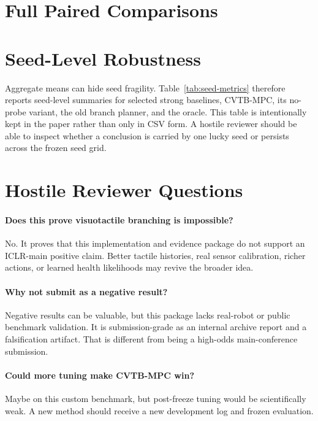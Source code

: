 \documentclass{article}
\newcommand{\method}{\textsc{CVTB-MPC}}
\begin{document}


\clearpage
\section{Full Paired Comparisons}



\clearpage
\section{Seed-Level Robustness}

Aggregate means can hide seed fragility. Table~\ref{tab:seed-metrics} therefore reports seed-level summaries for selected strong baselines, \method{}, its no-probe variant, the old branch planner, and the oracle. This table is intentionally kept in the paper rather than only in CSV form. A hostile reviewer should be able to inspect whether a conclusion is carried by one lucky seed or persists across the frozen seed grid.



\clearpage
\section{Hostile Reviewer Questions}

\paragraph{Does this prove visuotactile branching is impossible?}
No. It proves that this implementation and evidence package do not support an ICLR-main positive claim. Better tactile histories, real sensor calibration, richer actions, or learned health likelihoods may revive the broader idea.

\paragraph{Why not submit as a negative result?}
Negative results can be valuable, but this package lacks real-robot or public benchmark validation. It is submission-grade as an internal archive report and a falsification artifact. That is different from being a high-odds main-conference submission.

\paragraph{Could more tuning make \method{} win?}
Maybe on this custom benchmark, but post-freeze tuning would be scientifically weak. A new method should receive a new development log and frozen evaluation.
\end{document}
